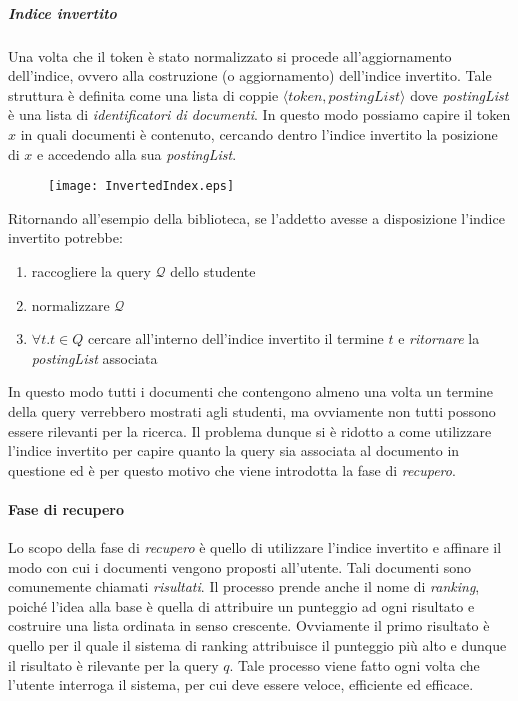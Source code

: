 \subparagraph{Indice invertito}
Una volta che il token è stato normalizzato si procede all'aggiornamento dell'indice, ovvero alla costruzione (o aggiornamento)
dell'indice invertito. Tale struttura è definita come una lista di coppie
$\langle token, postingList \rangle$ dove \textit{postingList} è una lista di \textit{identificatori di documenti}.
In questo modo possiamo capire il token $x$ in quali documenti è contenuto, cercando dentro l'indice
invertito la posizione di $x$ e accedendo alla sua \textit{postingList}.

\begin{figure}[h]
	\label{fig:invertedIndex}
	\centering
	\texttt{[image: InvertedIndex.eps]}
\end{figure}

\pagebreak

Ritornando all'esempio della biblioteca, se l'addetto avesse a disposizione l'indice invertito potrebbe:
\begin{enumerate}
	\item raccogliere la query $\mathcal{Q}$ dello studente
	\item normalizzare $\mathcal{Q}$
	\item $\forall t.t\in Q$ cercare all'interno dell'indice invertito il termine $t$ e \textit{ritornare} la \textit{postingList} associata
\end{enumerate}

In questo modo tutti i documenti che contengono almeno una volta un termine della query verrebbero mostrati
agli studenti, ma ovviamente non tutti possono essere rilevanti per la ricerca. Il problema dunque si è ridotto
a come utilizzare l'indice invertito per capire quanto la query sia associata al documento in questione ed è per questo
motivo che viene introdotta la fase di \textit{recupero}.

\paragraph{Fase di recupero}
Lo scopo della fase di \textit{recupero} è quello di utilizzare l'indice invertito e affinare il modo con cui
i documenti vengono proposti all'utente. Tali documenti sono comunemente chiamati \textit{risultati}.
Il processo prende anche il nome di \textit{ranking}, poiché l'idea alla base è quella di attribuire
un punteggio ad ogni risultato e costruire una lista ordinata in senso crescente.
Ovviamente il primo risultato è quello per il quale il sistema di ranking attribuisce
il  punteggio più alto e dunque il risultato è rilevante per la query $q$. 
Tale processo viene fatto ogni volta che l'utente
interroga il sistema, per cui deve essere veloce, efficiente ed efficace.

